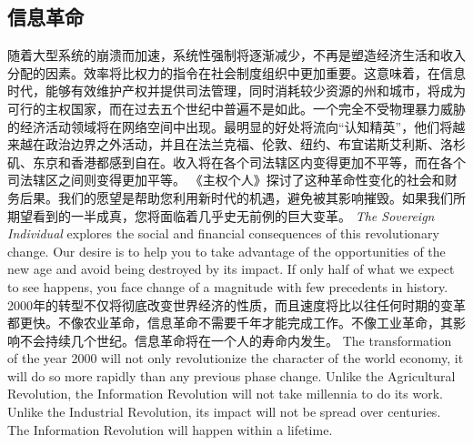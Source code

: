 \subsection{信息革命}
\begin{paracol}{2}[]
随着大型系统的崩溃而加速，系统性强制将逐渐减少，不再是塑造经济生活和收入分配的因素。效率将比权力的指令在社会制度组织中更加重要。这意味着，在信息时代，能够有效维护产权并提供司法管理，同时消耗较少资源的州和城市，将成为可行的主权国家，而在过去五个世纪中普遍不是如此。一个完全不受物理暴力威胁的经济活动领域将在网络空间中出现。最明显的好处将流向“认知精英”，他们将越来越在政治边界之外活动，并且在法兰克福、伦敦、纽约、布宜诺斯艾利斯、洛杉矶、东京和香港都感到自在。收入将在各个司法辖区内变得更加不平等，而在各个司法辖区之间则变得更加平等。
\switchcolumn
{}
\switchcolumn*
《主权个人》探讨了这种革命性变化的社会和财务后果。我们的愿望是帮助您利用新时代的机遇，避免被其影响摧毁。如果我们所期望看到的一半成真，您将面临着几乎史无前例的巨大变革。
\switchcolumn
\emph{The Sovereign Individual} explores the social and financial consequences of this revolutionary change. Our desire is to help you to take advantage of the opportunities of the new age and avoid being destroyed by its impact. If only half of what we expect to see happens, you face change of a magnitude with few precedents in history.
\switchcolumn*
2000年的转型不仅将彻底改变世界经济的性质，而且速度将比以往任何时期的变革都更快。不像农业革命，信息革命不需要千年才能完成工作。不像工业革命，其影响不会持续几个世纪。信息革命将在一个人的寿命内发生。
\switchcolumn
The transformation of the year 2000 will not only revolutionize the character of the world economy, it will do so more rapidly than any previous phase change. Unlike the Agricultural Revolution, the Information Revolution will not take millennia to do its work. Unlike the Industrial Revolution, its impact will not be spread over centuries. The Information Revolution will happen within a lifetime. 

\end{paracol}
